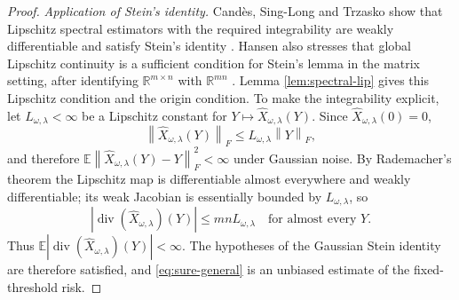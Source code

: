 \documentclass[12pt,reqno]{amsart}
\numberwithin{equation}{section}
\theoremstyle{plain}
\theoremstyle{definition}
\newcommand{\divop}{\operatorname{div}}
\newcommand{\R}{\mathbb{R}}
\newcommand{\E}{\mathbb{E}}
\newcommand{\norm}[1]{\left\lVert #1\right\rVert}
\begin{document}
\begin{proof}
\emph{Application of Stein's identity.} Cand\`es, Sing-Long and Trzasko show that Lipschitz spectral estimators with the required integrability are weakly differentiable and satisfy Stein's identity \cite{candes2013unbiased}. Hansen also stresses that global Lipschitz continuity is a sufficient condition for Stein's lemma in the matrix setting, after identifying $\R^{m\times n}$ with $\R^{mn}$ \cite{hansen2017comment}. Lemma \ref{lem:spectral-lip} gives this Lipschitz condition and the origin condition. To make the integrability explicit, let $L_{\omega,\lambda}<\infty$ be a Lipschitz constant for $Y\mapsto\widehat X_{\omega,\lambda}(Y)$. Since $\widehat X_{\omega,\lambda}(0)=0$,
\begin{equation}
    \norm{\widehat X_{\omega,\lambda}(Y)}_F
    \leq L_{\omega,\lambda}\norm{Y}_F,
\end{equation}
and therefore $\E\norm{\widehat X_{\omega,\lambda}(Y)-Y}_F^2<\infty$ under Gaussian noise. By Rademacher's theorem the Lipschitz map is differentiable almost everywhere and weakly differentiable; its weak Jacobian is essentially bounded by $L_{\omega,\lambda}$, so
\begin{equation}
    |\divop(\widehat X_{\omega,\lambda})(Y)|
    \leq mn L_{\omega,\lambda}
    \quad\text{for almost every }Y.
\end{equation}
Thus $\E|\divop(\widehat X_{\omega,\lambda})(Y)|<\infty$. The hypotheses of the Gaussian Stein identity are therefore satisfied, and \eqref{eq:sure-general} is an unbiased estimate of the fixed-threshold risk.
\end{proof}
\end{document}
